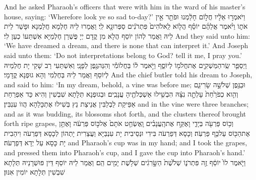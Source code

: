 {And he asked Pharaoh’s officers that were with him in the ward of his master’s house, saying: ‘Wherefore look ye so sad to-day?’}{}
{וַיֹּאמְר֣וּ אֵלָ֔יו חֲל֣וֹם חָלַ֔מְנוּ וּפֹתֵ֖ר אֵ֣ין אֹת֑וֹ וַיֹּ֨אמֶר אֲלֵהֶ֜ם יוֹסֵ֗ף הֲל֤וֹא לֵֽאלֹהִים֙ פִּתְרֹנִ֔ים סַפְּרוּ\maqqaf נָ֖א לִֽי׃}
{וַאֲמַרוּ לֵיהּ חֶלְמָא חֲלַמְנָא וּפָשַׁר לֵית לֵיהּ וַאֲמַר לְהוֹן יוֹסֵף הֲלָא מִן קֳדָם יְיָ פֻּשְׁרַן חֶלְמַיָּא אִשְׁתַּעוֹ כְעַן לִי׃}
{And they said unto him: ‘We have dreamed a dream, and there is none that can interpret it.’ And Joseph said unto them: ‘Do not interpretations belong to God? tell it me, I pray you.’}{}
{וַיְסַפֵּ֧ר שַֽׂר\maqqaf הַמַּשְׁקִ֛ים אֶת\maqqaf חֲלֹמ֖וֹ לְיוֹסֵ֑ף וַיֹּ֣אמֶר ל֔וֹ בַּחֲלוֹמִ֕י וְהִנֵּה\maqqaf גֶ֖פֶן לְפָנָֽי׃}
{וְאִשְׁתַּעִי רַב שָׁקֵי יָת חֶלְמֵיהּ לְיוֹסֵף וַאֲמַר לֵיהּ בְּחֶלְמִי וְהָא גוּפְנָא קֳדָמָי׃}
{And the chief butler told his dream to Joseph, and said to him: ‘In my dream, behold, a vine was before me;}{}
{וּבַגֶּ֖פֶן שְׁלֹשָׁ֣ה שָׂרִיגִ֑ם וְהִ֤וא כְפֹרַ֙חַת֙ עָלְתָ֣ה נִצָּ֔הּ הִבְשִׁ֥ילוּ אַשְׁכְּלֹתֶ֖יהָ עֲנָבִֽים׃}
{וּבְגוּפְנָא תְּלָתָא שִׁבְשִׁין וְהִיא כַּד אַפְרַחַת אַפֵּיקַת לַבְלַבִּין אֲנֵיצַת נַץ בְּשִׁילוּ אֶתְכָּלַהָא הֲווֹ עִנְבִּין׃}
{and in the vine were three branches; and as it was budding, its blossoms shot forth, and the clusters thereof brought forth ripe grapes,}{}
{וְכ֥וֹס פַּרְעֹ֖ה בְּיָדִ֑י וָאֶקַּ֣ח אֶת\maqqaf הָֽעֲנָבִ֗ים וָֽאֶשְׂחַ֤ט אֹתָם֙ אֶל\maqqaf כּ֣וֹס פַּרְעֹ֔ה וָאֶתֵּ֥ן אֶת\maqqaf הַכּ֖וֹס עַל\maqqaf כַּ֥ף פַּרְעֹֽה׃}
{וְכָסָא דְּפַרְעֹה בִּידִי וּנְסֵיבִית יָת עִנְבַּיָּא וַעֲצַרִית יָתְהוֹן לְכָסָא דְּפַרְעֹה וִיהַבִית יָת כָּסָא עַל יְדָא דְּפַרְעֹה׃}
{and Pharaoh’s cup was in my hand; and I took the grapes, and pressed them into Pharaoh’s cup, and I gave the cup into Pharaoh’s hand.’}{}
{וַיֹּ֤אמֶר לוֹ֙ יוֹסֵ֔ף זֶ֖ה פִּתְרֹנ֑וֹ שְׁלֹ֙שֶׁת֙ הַשָּׂ֣רִגִ֔ים שְׁלֹ֥שֶׁת יָמִ֖ים הֵֽם׃}
{וַאֲמַר לֵיהּ יוֹסֵף דֵּין פּוּשְׁרָנֵיהּ תְּלָתָא שִׁבְשִׁין תְּלָתָא יוֹמִין אִנּוּן׃}
